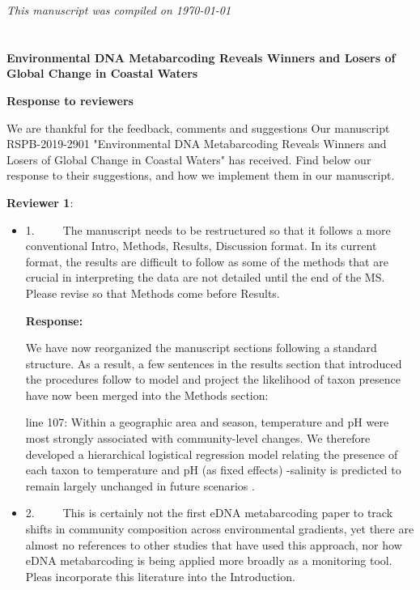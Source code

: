 \documentclass[11pt]{article}
\begin{document}
\begin{linenumbers}
       
   
\textit{\tiny	This manuscript was compiled on \today }	
\section*{}

\textbf{ 
 Environmental DNA Metabarcoding Reveals Winners and Losers of Global Change in Coastal Waters} 
  
\textbf {Response to reviewers}


\vspace*{1em}

We are thankful for the feedback, comments and suggestions Our manuscript RSPB-2019-2901  "Environmental DNA Metabarcoding Reveals Winners and Losers of Global Change in Coastal Waters" has received. Find below our response to their suggestions, and how we implement them in our manuscript.

\vspace*{1em}
\textbf{\large{ Reviewer 1}}: 

\begin{itemize}

\item{1.      The manuscript needs to be restructured so that it follows a more conventional Intro, Methods, Results, Discussion format. In its current format, the results are difficult to follow as some of the methods that are crucial in interpreting the data are not detailed until the end of the MS. Please revise so that Methods come before Results. }

\textbf{Response:}

We have now reorganized the manuscript sections following a standard structure. As a result, a few sentences in the results section that introduced the procedures follow to model and project the likelihood of taxon presence have now been merged  into the Methods section:

line 107: Within a geographic area and season, temperature and pH were most strongly associated with community-level changes. We therefore developed a hierarchical logistical regression model relating the presence of each taxon to temperature and pH (as fixed effects) {\color{red} -salinity is predicted to remain largely unchanged in future scenarios \cite{khangaonkar2019salish}.}



\item{2.      This is certainly not the first eDNA metabarcoding paper to track shifts in community composition across environmental gradients, yet there are almost no references to other studies that have used this approach, nor how eDNA metabarcoding is being applied more broadly as a monitoring tool. Pleas incorporate this literature into the Introduction. }


\end{itemize}
\end{linenumbers}
\end{document}
